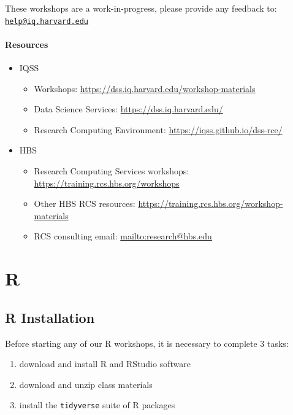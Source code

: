 \documentclass[]{book}
\providecommand{\tightlist}{%
  \setlength{\itemsep}{0pt}\setlength{\parskip}{0pt}}
\begin{document}
These workshops are a work-in-progress, please provide any feedback to: \href{mailto:help@iq.harvard.edu}{\nolinkurl{help@iq.harvard.edu}}

\hypertarget{resources}{%
\subsection{Resources}\label{resources}}

\begin{itemize}
\tightlist
\item
  IQSS

  \begin{itemize}
  \tightlist
  \item
    Workshops: \url{https://dss.iq.harvard.edu/workshop-materials}
  \item
    Data Science Services: \url{https://dss.iq.harvard.edu/}
  \item
    Research Computing Environment: \url{https://iqss.github.io/dss-rce/}
  \end{itemize}
\item
  HBS

  \begin{itemize}
  \tightlist
  \item
    Research Computing Services workshops: \url{https://training.rcs.hbs.org/workshops}
  \item
    Other HBS RCS resources: \url{https://training.rcs.hbs.org/workshop-materials}
  \item
    RCS consulting email: \url{mailto:research@hbs.edu}
  \end{itemize}
\end{itemize}

\hypertarget{part-r}{%
\part{R}\label{part-r}}

\hypertarget{r-installation}{%
\chapter{R Installation}\label{r-installation}}

Before starting any of our R workshops, it is necessary to complete 3 tasks:

\begin{enumerate}
\def\labelenumi{\arabic{enumi}.}
\tightlist
\item
  download and install R and RStudio software
\item
  download and unzip class materials
\item
  install the \texttt{tidyverse} suite of R packages
\end{enumerate}
\end{document}
